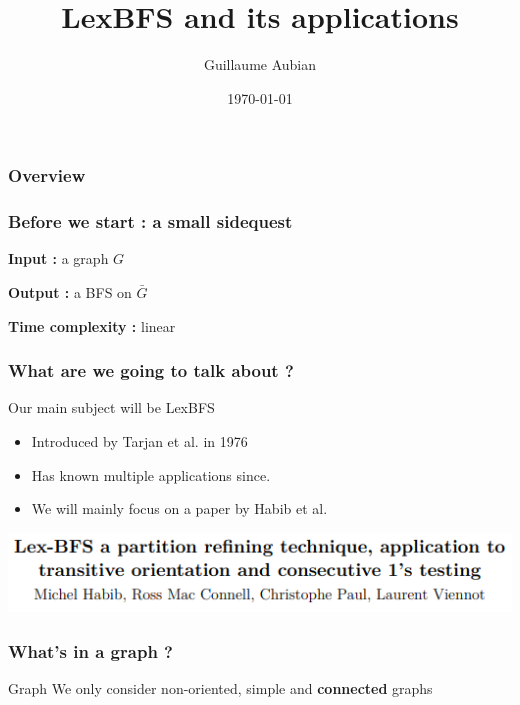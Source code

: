 \documentclass{beamer}
\begin{document}
\title{LexBFS and its applications}  
\author{Guillaume Aubian}
\date{\today} 


\begin{frame}
\titlepage
\end{frame}

\begin{frame}\frametitle{Overview}\tableofcontents
\end{frame} 


\begin{frame}\frametitle{Before we start : a small sidequest}
     \Huge
	\textbf{Input :} a graph $G$

     	\textbf{Output :} a BFS on $\bar{G}$
     
     	\textbf{Time complexity :} linear
\end{frame}

\begin{frame}\frametitle{What are we going to talk about ?}
    Our main subject will be LexBFS
     \begin{itemize}
	\item Introduced by Tarjan et al. in 1976
	\item Has known multiple applications since.
	\item We will mainly focus on a paper by Habib et al.
     \end{itemize}
     \begin{center}
	     \includegraphics[scale=0.5]{screenshot.png}
     \end{center}
\end{frame}

\begin{frame}\frametitle{What's in a graph ?}
    \begin{block}{Graph}
	We only consider non-oriented, simple and \textbf{connected} graphs
    \end{block}

    \begin{center}
    \end{center}

\end{frame}
\end{document}
